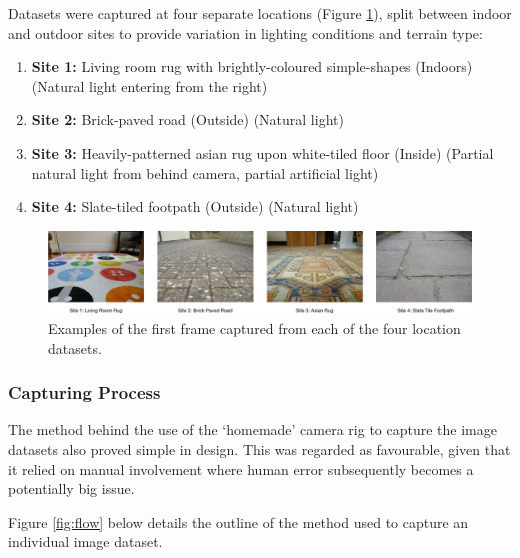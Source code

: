 Datasets were captured at four separate locations (Figure \ref{fig:location}), split between indoor and outdoor sites to provide variation in lighting conditions and terrain type:

\begin{enumerate}
	\item \textbf{Site 1:} Living room rug with brightly-coloured simple-shapes (Indoors) (Natural light entering from the right)
	\item \textbf{Site 2:} Brick-paved road (Outside) (Natural light)
	\item \textbf{Site 3:} Heavily-patterned asian rug upon white-tiled floor (Inside) (Partial natural light from behind camera, partial artificial light)
	\item \textbf{Site 4:} Slate-tiled footpath (Outside) (Natural light)
\end{enumerate}

\begin{figure}[ht!]
\centering
\includegraphics[scale=0.35]{images/locations.png}
  \caption{Examples of the first frame captured from each of the four location datasets.}
\label{fig:location}
\end{figure}

\clearpage
\subsubsection{Capturing Process}

The method behind the use of the `homemade' camera rig to capture the image datasets also proved simple in design. This was regarded as favourable, given that it relied on manual involvement where human error subsequently becomes a potentially big issue. 

Figure \ref{fig:flow} below details the outline of the method used to capture an individual image dataset.

